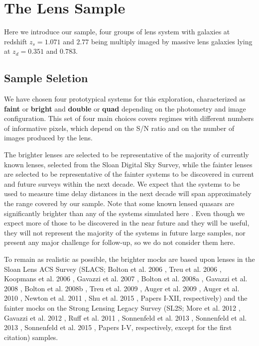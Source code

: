 \documentclass[a4paper,11pt]{article}
\begin{document}
\section{The Lens Sample}

Here we introduce our sample, four groups of lens system with galaxies at redshift $z_s = 1.071$ and $2.77$ being multiply imaged by massive lens galaxies lying at $z_d = 0.351$ and $0.783$.

\subsection{Sample Seletion}

We have chosen four prototypical systems for this exploration,
characterized as \textbf{faint} or \textbf{bright} and \textbf{double}
or \textbf{quad} depending on the photometry and image
configuration. This set of four main choices covers regimes with
different numbers of informative pixels, which depend on the S/N ratio
and on the number of images produced by the lens.

The brighter lenses are selected to be representative of the majority
of currently known lenses, selected from the Sloan Digital Sky Survey,
while the fainter lenses are selected to be representative of the
fainter systems to be discovered in current and future surveys within
the next decade. We expect that the systems to be used to measure time
delay distances in the next decade will span approximately the range
covered by our sample. Note that some known lensed quasars are
significantly brighter than any of the systems simulated here
\cite[e.g.,][]{1992MNRAS.259P...1P}. Even though we expect more of those to be discovered in the near future and they will be useful, they will not 
represent the majority of the systems in future large samples, nor
present any major challenge for follow-up, so we do not consider them
here.

To remain as realistic as possible, the brighter mocks are based upon
lenses in the Sloan Lens ACS Survey (SLACS; Bolton et al. 2006
\cite{2006ApJ...638..703B}, Treu et al. 2006
\cite{2006ApJ...640..662T}, Koopmans et al. 2006
\cite{2006ApJ...649..599K}, Gavazzi et al. 2007
\cite{2007ApJ...667..176G}, Bolton et al. 2008a
\cite{2008ApJ...682..964B}, Gavazzi et al. 2008
\cite{2008ApJ...677.1046G}, Bolton et al. 2008b
\cite{2008ApJ...684..248B}, Treu et al. 2009
\cite{2009ApJ...690..670T}, Auger et al. 2009
\cite{2009ApJ...705.1099A}, Auger et al. 2010
\cite{2010ApJ...724..511A}, Newton et al. 2011
\cite{2011ApJ...734..104N}, Shu et al. 2015
\cite{2014arXiv1407.2240S}, Papers I-XII, respectively) and the fainter mocks on the Strong
Lensing Legacy Survey (SL2S; More et al. 2012
\cite{2012ApJ...749...38M}, Gavazzi et al. 2012 \cite{2012ApJ...761..170G},
Ruff et al. 2011 \cite{2011ApJ...727...96R}, Sonnenfeld et al. 2013
\cite{2013ApJ...777...97S}, Sonnenfeld et al. 2013
\cite{2013ApJ...777...98S}, Sonnenfeld et al. 2015
\cite{2015ApJ...800...94S}, Papers I-V, respectively, except for the
first citation) samples.
\end{document}
